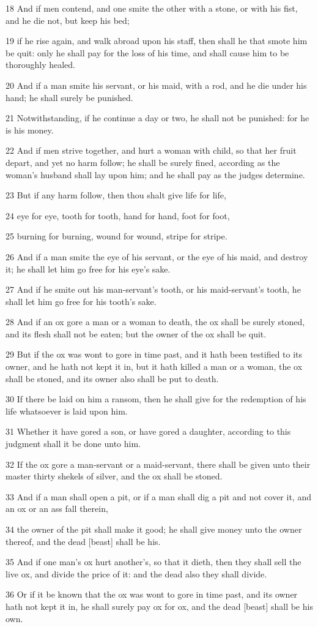 \par 18 And if men contend, and one smite the other with a stone, or with his fist, and he die not, but keep his bed;
\par 19 if he rise again, and walk abroad upon his staff, then shall he that smote him be quit: only he shall pay for the loss of his time, and shall cause him to be thoroughly healed.
\par 20 And if a man smite his servant, or his maid, with a rod, and he die under his hand; he shall surely be punished.
\par 21 Notwithstanding, if he continue a day or two, he shall not be punished: for he is his money.
\par 22 And if men strive together, and hurt a woman with child, so that her fruit depart, and yet no harm follow; he shall be surely fined, according as the woman's husband shall lay upon him; and he shall pay as the judges determine.
\par 23 But if any harm follow, then thou shalt give life for life,
\par 24 eye for eye, tooth for tooth, hand for hand, foot for foot,
\par 25 burning for burning, wound for wound, stripe for stripe.
\par 26 And if a man smite the eye of his servant, or the eye of his maid, and destroy it; he shall let him go free for his eye's sake.
\par 27 And if he smite out his man-servant's tooth, or his maid-servant's tooth, he shall let him go free for his tooth's sake.
\par 28 And if an ox gore a man or a woman to death, the ox shall be surely stoned, and its flesh shall not be eaten; but the owner of the ox shall be quit.
\par 29 But if the ox was wont to gore in time past, and it hath been testified to its owner, and he hath not kept it in, but it hath killed a man or a woman, the ox shall be stoned, and its owner also shall be put to death.
\par 30 If there be laid on him a ransom, then he shall give for the redemption of his life whatsoever is laid upon him.
\par 31 Whether it have gored a son, or have gored a daughter, according to this judgment shall it be done unto him.
\par 32 If the ox gore a man-servant or a maid-servant, there shall be given unto their master thirty shekels of silver, and the ox shall be stoned.
\par 33 And if a man shall open a pit, or if a man shall dig a pit and not cover it, and an ox or an ass fall therein,
\par 34 the owner of the pit shall make it good; he shall give money unto the owner thereof, and the dead [beast] shall be his.
\par 35 And if one man's ox hurt another's, so that it dieth, then they shall sell the live ox, and divide the price of it: and the dead also they shall divide.
\par 36 Or if it be known that the ox was wont to gore in time past, and its owner hath not kept it in, he shall surely pay ox for ox, and the dead [beast] shall be his own.

